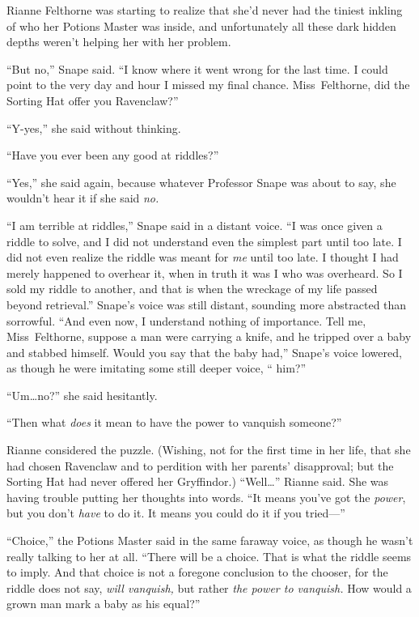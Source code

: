 Rianne Felthorne was starting to realize that she’d never had the tiniest inkling of who her Potions Master was inside, and unfortunately all these dark hidden depths weren’t helping her with her problem.

“But no,” Snape said. “I know where it went wrong for the last time. I could point to the very day and hour I missed my final chance. Miss~Felthorne, did the Sorting Hat offer you Ravenclaw?”

“Y-yes,” she said without thinking.

“Have you ever been any good at riddles?”

“Yes,” she said again, because whatever Professor Snape was about to say, she wouldn’t hear it if she said \emph{no.}

“I am terrible at riddles,” Snape said in a distant voice. “I was once given a riddle to solve, and I did not understand even the simplest part until too late. I did not even realize the riddle was meant for \emph{me} until too late. I thought I had merely happened to overhear it, when in truth it was I who was overheard. So I sold my riddle to another, and that is when the wreckage of my life passed beyond retrieval.” Snape’s voice was still distant, sounding more abstracted than sorrowful. “And even now, I understand nothing of importance. Tell me, Miss~Felthorne, suppose a man were carrying a knife, and he tripped over a baby and stabbed himself. Would you say that the baby had,” Snape’s voice lowered, as though he were imitating some still deeper voice, “ him?”

“Um…no?” she said hesitantly.

“Then what \emph{does} it mean to have the power to vanquish someone?”

Rianne considered the puzzle. (Wishing, not for the first time in her life, that she had chosen Ravenclaw and to perdition with her parents’ disapproval; but the Sorting Hat had never offered her Gryffindor.) “Well…” Rianne said. She was having trouble putting her thoughts into words. “It means you’ve got the \emph{power}, but you don’t \emph{have} to do it. It means you could do it if you tried—”

“Choice,” the Potions Master said in the same faraway voice, as though he wasn’t really talking to her at all. “There will be a choice. That is what the riddle seems to imply. And that choice is not a foregone conclusion to the chooser, for the riddle does not say, \emph{will vanquish,} but rather \emph{the power to vanquish.} How would a grown man mark a baby as his equal?”

